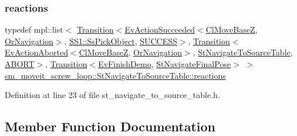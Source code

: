 \subsubsection{\texorpdfstring{reactions}{reactions}}
{\footnotesize\ttfamily typedef mpl\+::list$<$ \hyperlink{classsmacc_1_1Transition}{Transition}$<$\hyperlink{structsmacc_1_1default__events_1_1EvActionSucceeded}{Ev\+Action\+Succeeded}$<$\hyperlink{classcl__move__base__z_1_1ClMoveBaseZ}{Cl\+Move\+BaseZ}, \hyperlink{classsm__moveit__screw__loop_1_1OrNavigation}{Or\+Navigation}$>$, \hyperlink{structsm__moveit__screw__loop_1_1SS1_1_1SsPickObject}{S\+S1\+::\+Ss\+Pick\+Object}, \hyperlink{structsmacc_1_1default__transition__tags_1_1SUCCESS}{S\+U\+C\+C\+E\+SS}$>$, \hyperlink{classsmacc_1_1Transition}{Transition}$<$\hyperlink{structsmacc_1_1default__events_1_1EvActionAborted}{Ev\+Action\+Aborted}$<$\hyperlink{classcl__move__base__z_1_1ClMoveBaseZ}{Cl\+Move\+BaseZ}, \hyperlink{classsm__moveit__screw__loop_1_1OrNavigation}{Or\+Navigation}$>$, \hyperlink{structsm__moveit__screw__loop_1_1StNavigateToSourceTable}{St\+Navigate\+To\+Source\+Table}, \hyperlink{structsmacc_1_1default__transition__tags_1_1ABORT}{A\+B\+O\+RT}$>$, \hyperlink{classsmacc_1_1Transition}{Transition}$<$\hyperlink{structsm__moveit__screw__loop_1_1EvFinishDemo}{Ev\+Finish\+Demo}, \hyperlink{structsm__moveit__screw__loop_1_1StNavigateFinalPose}{St\+Navigate\+Final\+Pose}$>$ $>$ \hyperlink{structsm__moveit__screw__loop_1_1StNavigateToSourceTable_a8c117a31115b8037ce188be9e98134d1}{sm\+\_\+moveit\+\_\+screw\+\_\+loop\+::\+St\+Navigate\+To\+Source\+Table\+::reactions}}



Definition at line 23 of file st\+\_\+navigate\+\_\+to\+\_\+source\+\_\+table.\+h.



\subsection{Member Function Documentation}
\mbox{\label{structsm__moveit__screw__loop_1_1StNavigateToSourceTable_aecae5ab45f4c397ba5b72f9d85bde2fe}} 
